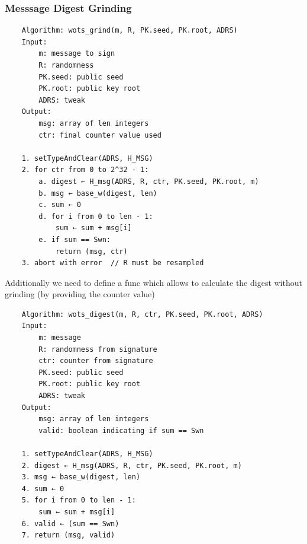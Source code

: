 \subsubsection{Messsage Digest Grinding}
\begin{verbatim}
    Algorithm: wots_grind(m, R, PK.seed, PK.root, ADRS)
    Input:
        m: message to sign
        R: randomness
        PK.seed: public seed
        PK.root: public key root
        ADRS: tweak
    Output:
        msg: array of len integers
        ctr: final counter value used

    1. setTypeAndClear(ADRS, H_MSG)
    2. for ctr from 0 to 2^32 - 1:
        a. digest ← H_msg(ADRS, R, ctr, PK.seed, PK.root, m)
        b. msg ← base_w(digest, len)
        c. sum ← 0
        d. for i from 0 to len - 1:
            sum ← sum + msg[i]
        e. if sum == Swn:
            return (msg, ctr)
    3. abort with error  // R must be resampled
\end{verbatim}

Additionally we need to define a func which allows to calculate the digest without grinding (by providing the counter value)

\begin{verbatim}
    Algorithm: wots_digest(m, R, ctr, PK.seed, PK.root, ADRS)
    Input:
        m: message
        R: randomness from signature
        ctr: counter from signature
        PK.seed: public seed
        PK.root: public key root
        ADRS: tweak
    Output:
        msg: array of len integers
        valid: boolean indicating if sum == Swn

    1. setTypeAndClear(ADRS, H_MSG)
    2. digest ← H_msg(ADRS, R, ctr, PK.seed, PK.root, m)
    3. msg ← base_w(digest, len)
    4. sum ← 0
    5. for i from 0 to len - 1:
        sum ← sum + msg[i]
    6. valid ← (sum == Swn)
    7. return (msg, valid)
\end{verbatim}

